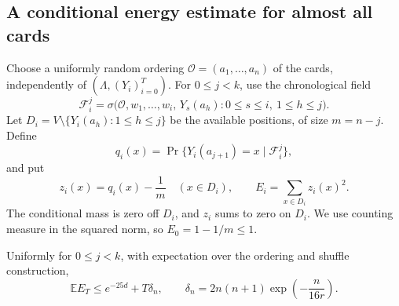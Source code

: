 \subsection{A conditional energy estimate for almost all cards}

Choose a uniformly random ordering
$\mathcal O=(a_1,\ldots,a_n)$ of the cards, independently of
$(\Lambda,(Y_i)_{i=0}^T)$. For $0\le j<k$, use the chronological field
\[
 \mathcal F_i^j
 =\sigma\bigl(\mathcal O,w_1,\ldots,w_i,\,
       Y_s(a_h):0\le s\le i,\ 1\le h\le j\bigr).
\]
Let $D_i=V\setminus\{Y_i(a_h):1\le h\le j\}$ be the available
positions, of size $m=n-j$. Define
\[
 q_i(x)=\Pr\{Y_i(a_{j+1})=x\mid\mathcal F_i^j\},
\]
and put
\[
 z_i(x)=q_i(x)-\frac1m\quad(x\in D_i),\qquad
 E_i=\sum_{x\in D_i}z_i(x)^2.
\]
The conditional mass is zero off $D_i$, and $z_i$ sums to zero on
$D_i$. We use counting measure in the squared norm, so
$E_0=1-1/m\le1$.

\begin{lemma}\label{frames:aux:energy}
Uniformly for $0\le j<k$, with expectation over the ordering and shuffle
construction,
\begin{equation}\label{frames:aux:energy-bound}
 \mathbb E E_T\le e^{-25d}+T\delta_n,
 \qquad
 \delta_n=2n(n+1)\exp\left(-\frac{n}{16r}\right).
\end{equation}
\end{lemma}


